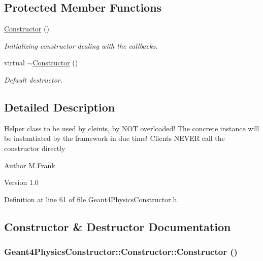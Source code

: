 \subsection*{Protected Member Functions}
\begin{DoxyCompactItemize}
\item 
\hyperlink{class_d_d4hep_1_1_simulation_1_1_geant4_physics_constructor_1_1_constructor_ad1c610b29914e3dbbd472e95ed60a07d}{Constructor} ()
\begin{DoxyCompactList}\small\item\em Initializing constructor dealing with the callbacks. \item\end{DoxyCompactList}\item 
virtual \hyperlink{class_d_d4hep_1_1_simulation_1_1_geant4_physics_constructor_1_1_constructor_a9b97bd3101cbf16f3ff03b382763c3a0}{$\sim$Constructor} ()
\begin{DoxyCompactList}\small\item\em Default destructor. \item\end{DoxyCompactList}\end{DoxyCompactItemize}


\subsection{Detailed Description}
Helper class to be used by cleints, by NOT overloaded! The concrete instance will be instantiated by the framework in due time! Clients NEVER call the constructor directly

\begin{DoxyAuthor}{Author}
M.Frank 
\end{DoxyAuthor}
\begin{DoxyVersion}{Version}
1.0 
\end{DoxyVersion}


Definition at line 61 of file Geant4PhysicsConstructor.h.

\subsection{Constructor \& Destructor Documentation}
\hypertarget{class_d_d4hep_1_1_simulation_1_1_geant4_physics_constructor_1_1_constructor_ad1c610b29914e3dbbd472e95ed60a07d}{
\subsubsection[{Constructor}]{\setlength{\rightskip}{0pt plus 5cm}Geant4PhysicsConstructor::Constructor::Constructor ()}}
\label{class_d_d4hep_1_1_simulation_1_1_geant4_physics_constructor_1_1_constructor_ad1c610b29914e3dbbd472e95ed60a07d}


